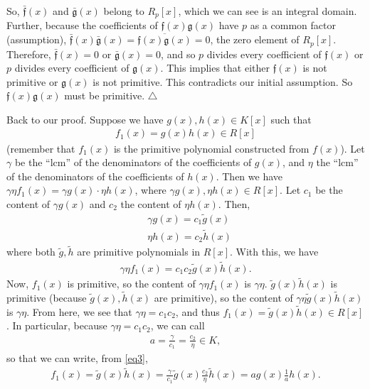 \documentclass[12pt]{article}
\newcommand{\nn}{\nonumber}
\newcommand{\f}[2]{\frac{#1}{#2}}
\begin{document}
\begin{framed}
So, $\bar{\mathfrak{f}}(x)$ and $\bar{\mathfrak{g}}(x)$ belong to $R_p[x]$, which we can see is an integral domain. Further, because the coefficients of $\mathfrak{f}(x)\mathfrak{g}(x)$ have $p$ as a common factor (assumption), $\bar{\mathfrak{f}}(x)\bar{\mathfrak{g}}(x) = \overline{\mathfrak{f}(x)\mathfrak{g}(x)} = 0$, the zero element of $R_p[x]$. Therefore, $\bar{\mathfrak{f}}(x) = 0$ or $\bar{\mathfrak{g}}(x) = 0$, and so $p$ divides every coefficient of $\mathfrak{f}(x)$ or $p$ divides every coefficient of $\mathfrak{g}(x)$. This implies that either $\mathfrak{f}(x)$ is not primitive or $\mathfrak{g}(x)$ is not primitive. This contradicts our initial assumption. So $\mathfrak{f}(x)\mathfrak{g}(x)$ must be primitive. \hfill$\triangle$
\end{framed}


Back to our proof. Suppose we have $g(x),h(x) \in K[x]$ such that 
\begin{align*}
f_1(x) = g(x)h(x) \in R[x]
\end{align*}
(remember that $f_1(x)$ is the primitive polynomial constructed from $f(x)$). Let $\gamma$ be the ``lcm'' of the denominators of the coefficients of $g(x)$, and $\eta$ the ``lcm'' of the denominators of the coefficients of $h(x)$. Then we have $\gamma\eta f_1(x) = \gamma g(x) \cdot \eta h(x)$, where $\gamma g(x), \eta h(x) \in R[x]$. Let $c_1$ be the content of $\gamma g(x)$ and $c_2$ the content of $\eta h(x)$. Then,
\begin{align*}
&\gamma g(x) = c_1 \tilde{g}(x)\nn\\
&\eta h(x) = c_2 \tilde{h}(x)\nn
\end{align*}  
where both $\tilde{g},\tilde{h}$ are primitive polynomials in $R[x]$. With this, we have
\begin{align}\label{eq3}
\gamma \eta f_1(x) = c_1 c_2 \tilde{g}(x)\tilde{h}(x).
\end{align}
Now, $f_1(x)$ is primitive, so the content of $\gamma \eta f_1(x)$ is $\gamma \eta$. $\tilde{g}(x)\tilde{h}(x)$ is primitive (because $\tilde{g}(x),\tilde{h}(x)$ are primitive), so the content of $\gamma \eta \tilde{g}(x)\tilde{h}(x)$ is $\gamma\eta$. From here, we see that $\gamma \eta = c_1 c_2$, and thus $f_1(x) = \tilde{g}(x)\tilde{h}(x) \in R[x]$.  In particular, because $\gamma \eta = c_1 c_2$, we can call
\begin{align*}
a = \f{\gamma}{c_1} = \f{c_2}{\eta} \in K,
\end{align*}
so that we can write, from \eqref{eq3},
\begin{align*}
f_1(x) = \tilde{g}(x)\tilde{h}(x) =  \f{\gamma}{c_1} \tilde{g}(x) \f{c_2}{\eta}\tilde{h}(x) = a g(x) \f{1}{a}h(x).
\end{align*}
\end{document}

